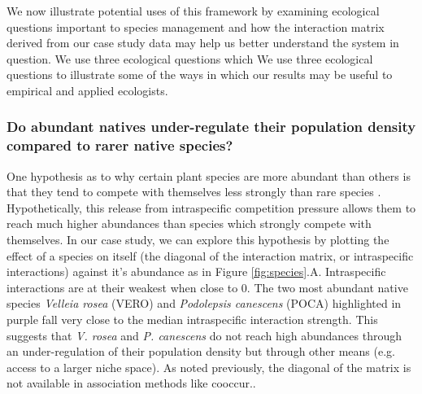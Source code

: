 \documentclass[a4,12pt]{article}
\begin{document}
    We now illustrate potential uses of this framework by examining ecological questions important to species management and how the interaction matrix derived from our case study data may help us better understand the system in question. We use three ecological questions which 
    We use three ecological questions to illustrate some of the ways in which our results may be useful to empirical and applied ecologists.
 
    \subsubsection*{Do abundant natives under-regulate their population density compared to rarer native species?}
    One hypothesis as to why certain plant species are more abundant than others is that they tend to compete with themselves less strongly than rare species \parencite{Yenni2012, Yenni2017}. Hypothetically, this release from intraspecific competition pressure allows them to reach much higher abundances than species which strongly compete with themselves. In our case study, we can explore this hypothesis by plotting the effect of a species on itself (the diagonal of the interaction matrix, or intraspecific interactions) against it's abundance as in Figure \ref{fig:species}.A. Intraspecific interactions are at their weakest when close to $0$. The two most abundant native species \textit{Velleia rosea} (VERO) and \textit{Podolepsis canescens} (POCA) highlighted in purple fall very close to the median intraspecific interaction strength. This suggests that \textit{V. rosea} and \textit{P. canescens} do not reach high abundances through an under-regulation of their population density but through other means (e.g. access to a larger niche space). As noted previously, the diagonal of the matrix is not available in association methods like cooccur..
\end{document}
